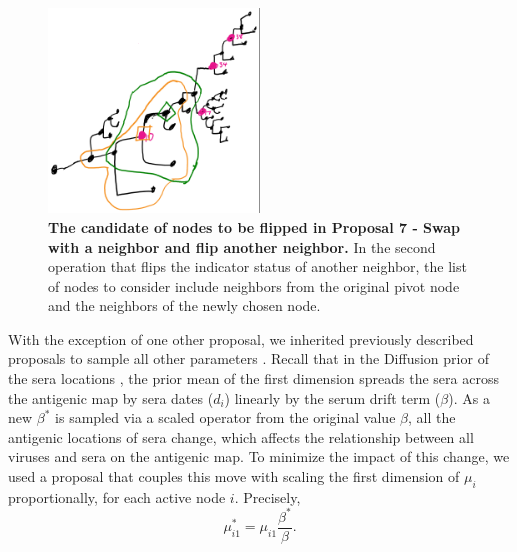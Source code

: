 \documentclass[11pt,oneside,letterpaper]{article}
\begin{document}
\begin{figure}[h]
	\centering		
	\includegraphics[width=0.5\textwidth]{figures/jointMultistep}
	\caption{\textbf{ The candidate of nodes to be flipped in Proposal 7 - Swap with a neighbor and flip another neighbor.} 
In the second operation that flips the indicator status of another neighbor, the list of nodes to consider include neighbors from the original pivot node and the neighbors of the newly chosen node. 
	} 
	\label{jointMultistep} 
\end{figure}





With the exception of one other proposal, we inherited previously described proposals to sample all other parameters \cite{bedford_integrating_2014}.
Recall that in the Diffusion prior of the sera locations \cite{bedford_integrating_2014}, the prior mean of the first dimension spreads the sera across the antigenic map by sera dates ($d_i$) linearly by the serum drift term ($\beta$).
As a new $\beta^{*}$ is sampled via a scaled operator \cite{bedford_integrating_2014} from the original value $\beta$, all the antigenic locations of sera change, which affects the relationship between all viruses and sera on the antigenic map.
To minimize the impact of this change, we used a proposal that couples this move with scaling the first dimension of $\mu_i$  proportionally, for each active node $i$. Precisely, 
\begin{equation}
\label{scaleMu1}
 \mu_{i1}^* = \mu_{i1} \frac{ \beta^*}{\beta} .
\end{equation}
\end{document}
